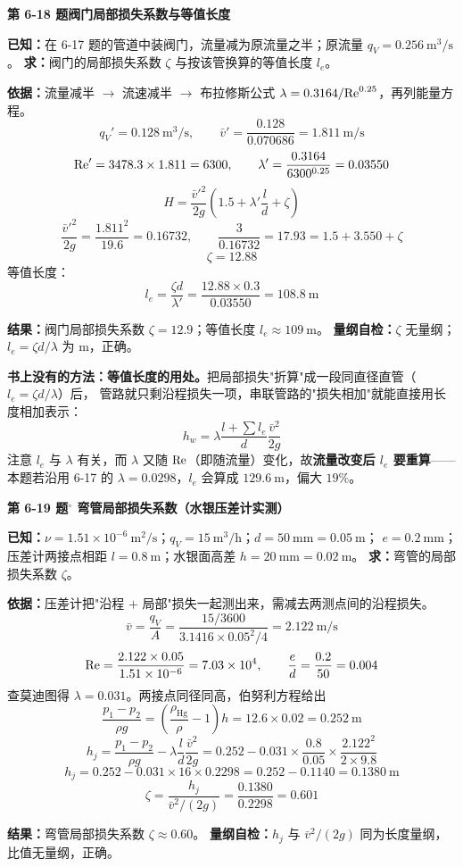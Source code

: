 \noindent\textbf{第 6-18 题\quad 阀门局部损失系数与等值长度}

\begin{jie}
\textbf{已知：}在 6-17 题的管道中装阀门，流量减为原流量之半；原流量 $q_V=0.256\ \mathrm{m^3/s}$。
\textbf{求：}阀门的局部损失系数 $\zeta$ 与按该管换算的等值长度 $l_e$。

\textbf{依据：}流量减半 $\to$ 流速减半 $\to$ 布拉修斯公式 $\lambda=0.3164/\mathrm{Re}^{0.25}$，再列能量方程。
\[ q_V'=0.128\ \mathrm{m^3/s},\qquad \bar v'=\frac{0.128}{0.070686}=1.811\ \mathrm{m/s} \]
\[ \mathrm{Re}'=3478.3\times1.811=6300,\qquad \lambda'=\frac{0.3164}{6300^{0.25}}=0.03550 \]
\[ H=\frac{\bar v'^2}{2g}\left(1.5+\lambda'\frac ld+\zeta\right) \]
\[ \frac{\bar v'^2}{2g}=\frac{1.811^2}{19.6}=0.16732,\qquad
\frac{3}{0.16732}=17.93=1.5+3.550+\zeta \]
\[ \zeta=12.88 \]
等值长度：
\[ l_e=\frac{\zeta d}{\lambda'}=\frac{12.88\times0.3}{0.03550}=108.8\ \mathrm{m} \]

\textbf{结果：}阀门局部损失系数 $\zeta=12.9$；等值长度 $l_e\approx109\ \mathrm{m}$。
\textbf{量纲自检：}$\zeta$ 无量纲；$l_e=\zeta d/\lambda$ 为 $\mathrm{m}$，正确。
\end{jie}

\begin{tishi}
\textbf{书上没有的方法：等值长度的用处。}把局部损失"折算"成一段同直径直管（$l_e=\zeta d/\lambda$）后，
管路就只剩沿程损失一项，串联管路的"损失相加"就能直接用长度相加表示：
\[ h_w=\lambda\frac{l+\sum l_e}{d}\frac{\bar v^2}{2g} \]
注意 $l_e$ 与 $\lambda$ 有关，而 $\lambda$ 又随 $\mathrm{Re}$（即随流量）变化，故\textbf{流量改变后 $l_e$ 要重算}——
本题若沿用 6-17 的 $\lambda=0.0298$，$l_e$ 会算成 $129.6\ \mathrm{m}$，偏大 $19\%$。
\end{tishi}

\noindent\textbf{第 6-19 题$^\circ$ 弯管局部损失系数（水银压差计实测）}

\begin{jie}
\textbf{已知：}$\nu=1.51\times10^{-6}\ \mathrm{m^2/s}$；$q_V=15\ \mathrm{m^3/h}$；$d=50\ \mathrm{mm}=0.05\ \mathrm{m}$；
$e=0.2\ \mathrm{mm}$；压差计两接点相距 $l=0.8\ \mathrm{m}$；水银面高差 $h=20\ \mathrm{mm}=0.02\ \mathrm{m}$。
\textbf{求：}弯管的局部损失系数 $\zeta$。

\textbf{依据：}压差计把"沿程 $+$ 局部"损失一起测出来，需减去两测点间的沿程损失。
\[ \bar v=\frac{q_V}{A}=\frac{15/3600}{3.1416\times0.05^2/4}=2.122\ \mathrm{m/s} \]
\[ \mathrm{Re}=\frac{2.122\times0.05}{1.51\times10^{-6}}=7.03\times10^4,\qquad \frac ed=\frac{0.2}{50}=0.004 \]
查莫迪图得 $\lambda=0.031$。两接点同径同高，伯努利方程给出
\[ \frac{p_1-p_2}{\rho g}=\left(\frac{\rho_{\text{Hg}}}{\rho}-1\right)h=12.6\times0.02=0.252\ \mathrm{m} \]
\[ h_j=\frac{p_1-p_2}{\rho g}-\lambda\frac ld\frac{\bar v^2}{2g}
=0.252-0.031\times\frac{0.8}{0.05}\times\frac{2.122^2}{2\times9.8} \]
\[ h_j=0.252-0.031\times16\times0.2298=0.252-0.1140=0.1380\ \mathrm{m} \]
\[ \zeta=\frac{h_j}{\bar v^2/(2g)}=\frac{0.1380}{0.2298}=0.601 \]

\textbf{结果：}弯管局部损失系数 $\zeta\approx0.60$。
\textbf{量纲自检：}$h_j$ 与 $\bar v^2/(2g)$ 同为长度量纲，比值无量纲，正确。
\end{jie}

